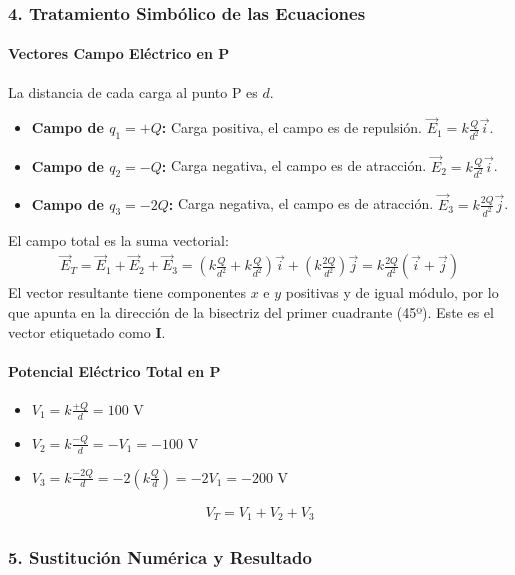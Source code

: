\subsubsection*{4. Tratamiento Simbólico de las Ecuaciones}
\paragraph*{Vectores Campo Eléctrico en P}
La distancia de cada carga al punto P es $d$.
\begin{itemize}
    \item \textbf{Campo de $q_1 = +Q$:} Carga positiva, el campo es de repulsión. $\vec{E}_1 = k \frac{Q}{d^2} \vec{i}$.
    \item \textbf{Campo de $q_2 = -Q$:} Carga negativa, el campo es de atracción. $\vec{E}_2 = k \frac{Q}{d^2} \vec{i}$.
    \item \textbf{Campo de $q_3 = -2Q$:} Carga negativa, el campo es de atracción. $\vec{E}_3 = k \frac{2Q}{d^2} \vec{j}$.
\end{itemize}
El campo total es la suma vectorial:
\begin{gather}
    \vec{E}_T = \vec{E}_1 + \vec{E}_2 + \vec{E}_3 = \left( k \frac{Q}{d^2} + k \frac{Q}{d^2} \right) \vec{i} + \left( k \frac{2Q}{d^2} \right) \vec{j} = k \frac{2Q}{d^2} (\vec{i} + \vec{j})
\end{gather}
El vector resultante tiene componentes $x$ e $y$ positivas y de igual módulo, por lo que apunta en la dirección de la bisectriz del primer cuadrante (45º). Este es el vector etiquetado como \textbf{I}.

\paragraph*{Potencial Eléctrico Total en P}
\begin{itemize}
    \item $V_1 = k \frac{+Q}{d} = 100 \text{ V}$
    \item $V_2 = k \frac{-Q}{d} = -V_1 = -100 \text{ V}$
    \item $V_3 = k \frac{-2Q}{d} = -2 \left( k \frac{Q}{d} \right) = -2 V_1 = -200 \text{ V}$
\end{itemize}
\begin{gather}
    V_T = V_1 + V_2 + V_3
\end{gather}

\subsubsection*{5. Sustitución Numérica y Resultado}
